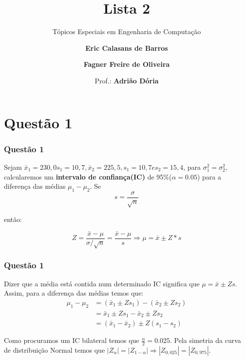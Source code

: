 \documentclass{beamer}\usepackage[]{graphicx}\usepackage[]{color}
\begin{document}
	\title{Lista 2}
	\subtitle{Tópicos Especiais em Engenharia de Computação}
	\author{\textbf{Eric Calasans de Barros} \and  \textbf{Fagner Freire de Oliveira} \\ \and Prof.:  \textbf{Adrião Dória}}
	
	\begin{frame}[plain]
		\maketitle
	\end{frame}
	
	\section{Questão 1}
		\begin{frame}
			\frametitle{Questão 1}
			Sejam $\bar{x}_{1} = 230,0 s_{1} = 10,7, \bar{x}_{2} = 225,5, s_{1} = 10,7 e s_{2} = 15,4$, para $\sigma_{1}^{2} = \sigma_{2}^{2}$, calcularemos um \textbf{intervalo de confiança(IC)} de 95\%($\alpha = 0.05$) para a diferença das médias $\mu_{1} - \mu_{2}$.  Se $$s = \frac{\sigma}{\sqrt{n}}$$
			
			então:
			
			$$Z = \frac{\bar{x} - \mu}{\sigma/\sqrt{n}} = \frac{\bar{x} - \mu}{s} \Rightarrow \mu = \bar{x} \pm Z*s$$
		\end{frame}
		\begin{frame}
			\frametitle{Questão 1}
			Dizer que a média está contida num determinado IC significa que $\mu = \bar{x} \pm Zs$.  Assim, para a diferença das médias temos que:
				\begin{align*}
					\mu_{1} - \mu_{2} &= (\bar{x}_{1} \pm Zs_{1}) - (\bar{x}_{2} \pm Zs_{2})\\
					&= \bar{x}_{1} \pm  Zs_{1} - \bar{x}_{2} \pm Zs_{2}\\
					&= (\bar{x}_{1} - \bar{x}_{2}) \pm Z(s_{1} - s_{2})
				\end{align*}
				
				Como procuramos um IC bilateral temos que $\frac{\alpha}{2} = 0.025$.  Pela simetria da curva de distribuição Normal temos que $|Z_{\alpha}| = |Z_{1-\alpha}| \Rightarrow |Z_{0,025}| = |Z_{0,975}|$.  
                \end{frame}
                
\end{document}
